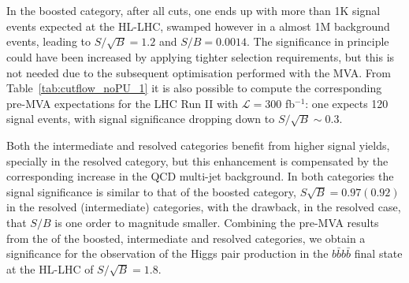       
    

\begin{table}[t]
  \centering
  \scriptsize
  
  $\,$ \\
  \vspace{0.5cm}
  
  $\,$ \\
  \vspace{0.5cm}
    
    \caption{\small The cross-sections, in femtobarns,
      for the signal and the various background
      processes at different steps of the
      cut-flow, for the resolved (upper table),
      intermediate (middle table) and boosted
      (lower table) categories, for the analysis
      without PU.
      In each case, we also provide the signal over
      background ratio, $S/B$, and the signal
      significance, $S/\sqrt{B}$, considering either
      the total background or only the $4b$ component.
      The different levels of the cut-flow are summarized
      in Table~\ref{tab:cutflowdetails}.
 \label{tab:cutflow_noPU_1}}
\end{table}



%
In the boosted category, after all cuts,
one ends
up with more than 1K signal events expected
at the HL-LHC, swamped  however in a almost 1M background events,
leading to $S/\sqrt{B}=1.2$ and $S/B=0.0014$.
%
The significance in principle could have been increased
by applying tighter selection requirements,
but this is not needed due to the subsequent
optimisation  performed with the MVA.
%
From  Table~\ref{tab:cutflow_noPU_1}
it is also possible to compute the corresponding pre-MVA
expectations for the LHC Run II with
$\mathcal{L}=300$ fb$^{-1}$: one expects
120 signal events, with signal significance dropping down to
$S/\sqrt{B}\sim 0.3$.
%

Both the intermediate and resolved categories benefit from higher signal yields,
specially in the resolved category, but this enhancement is compensated by the
corresponding
increase in the QCD multi-jet background.
%
In both categories
the signal significance is similar to that of the boosted category,
$S\sqrt{B}=0.97(0.92)$ in the resolved
(intermediate) categories,
with the drawback, in the resolved case,
that $S/B$
is one order to magnitude smaller.
%
Combining the pre-MVA results
from the
of the boosted, intermediate and resolved categories,
we obtain a significance for the observation of the Higgs pair production
in the $b\bar{b}b\bar{b}$ final
state at the HL-LHC of  $S/\sqrt{B}=1.8$.

